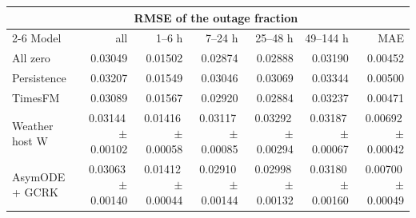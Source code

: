 \begin{tabular}{@{}lrrrrrr@{}}
\toprule
&\multicolumn{5}{c}{RMSE of the outage fraction}&\\
\cmidrule(lr){2-6}
Model&all&1--6 h&7--24 h&25--48 h&49--144 h&MAE\\
\midrule
All zero&0.03049&0.01502&0.02874&0.02888&0.03190&0.00452\\
Persistence&0.03207&0.01549&0.03046&0.03069&0.03344&0.00500\\
TimesFM&0.03089&0.01567&0.02920&0.02884&0.03237&0.00471\\
Weather host W&0.03144\,{\scriptsize$\pm$0.00102}&0.01416\,{\scriptsize$\pm$0.00058}&0.03117\,{\scriptsize$\pm$0.00085}&0.03292\,{\scriptsize$\pm$0.00294}&0.03187\,{\scriptsize$\pm$0.00067}&0.00692\,{\scriptsize$\pm$0.00042}\\
AsymODE + GCRK&0.03063\,{\scriptsize$\pm$0.00140}&0.01412\,{\scriptsize$\pm$0.00044}&0.02910\,{\scriptsize$\pm$0.00144}&0.02998\,{\scriptsize$\pm$0.00132}&0.03180\,{\scriptsize$\pm$0.00160}&0.00700\,{\scriptsize$\pm$0.00049}\\
\bottomrule
\end{tabular}

